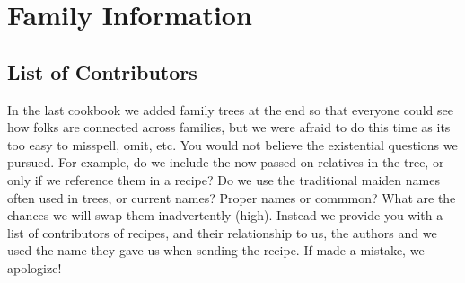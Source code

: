 \documentclass[12pt]{article}
\begin{document}







\appendix
{}
\newpage

\section{Family Information}

\subsection{List of Contributors}

In the last cookbook we added family trees at the end so that everyone could see how folks are connected across families, but we were afraid to do this time as its too easy to misspell, omit, etc. You would not believe the existential questions we pursued. For example, do we include the now passed on relatives in the tree, or only if we reference them in a recipe? Do we use the traditional maiden names often used in trees, or current names? Proper names or commmon? What are the chances we will swap them inadvertently (high).  Instead we provide you with a list of contributors of recipes, and their relationship to us, the authors and we used the name they gave us when sending the recipe. If made a mistake, we apologize!
\end{document}
